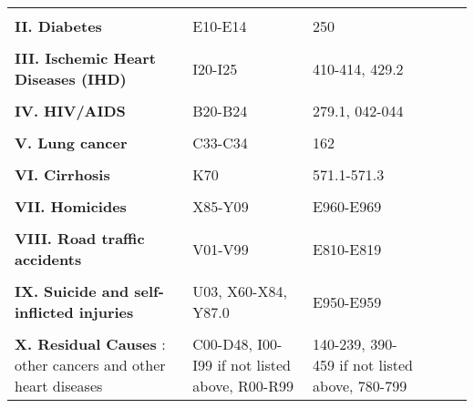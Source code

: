 \documentclass{article}
\begin{document}
{\begin{longtable}{p{8cm}p{4cm}p{4cm}ccc}
 & \\          
 {\bf II. Diabetes}  & E10-E14 & 250 \\      
 & \\
 {\bf III. Ischemic Heart Diseases (IHD)}   & I20-I25 & 410-414, 429.2\\
 & \\           
 {\bf IV. HIV/AIDS} & B20-B24 & 279.1, 042-044\\ 
  & \\                
{\bf V. Lung cancer}  & C33-C34 & 162\\
  & \\          
{\bf VI. Cirrhosis}&  K70 & 571.1-571.3\\
 & \\          
{\bf VII. Homicides}  & X85-Y09 & E960-E969\\     
 & \\           
 {\bf VIII. Road traffic accidents}  & V01-V99 & E810-E819 \\     
 & \\           
{\bf IX. Suicide and self-inflicted injuries}  & U03, X60-X84, Y87.0 & E950-E959\\ 
 & \\          
{\bf X. Residual Causes }:  other cancers and other heart diseases & C00-D48, I00-I99 if not listed above, R00-R99 & 140-239, 390-459 if not listed above, 780-799
\label{ME_Mex}
\end{longtable}
}
\end{document}

